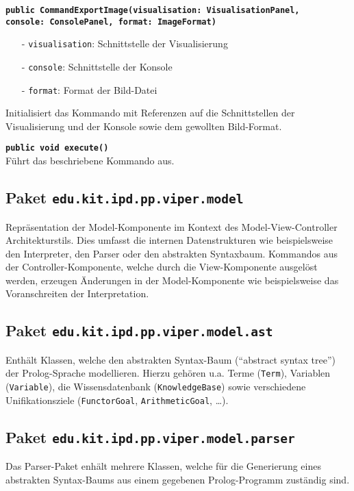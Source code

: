 \documentclass[parskip=full,11pt,twoside]{scrartcl}
\begin{document}
\textbf{\texttt{public CommandExportImage(visualisation: VisualisationPanel,\\console: ConsolePanel, format: ImageFormat)}}\\
\begin{itemize}[noitemsep]
	\item[-] \texttt{visualisation}: Schnittstelle der Visualisierung
	\item[-] \texttt{console}: Schnittstelle der Konsole
	\item[-] \texttt{format}: Format der Bild-Datei
\end{itemize}
Initialisiert das Kommando mit Referenzen auf die Schnittstellen der Visualisierung und der Konsole sowie dem gewollten Bild-Format.

\textbf{\texttt{public void execute()}}\\
Führt das beschriebene Kommando aus.

\subsection{Paket \texttt{edu.kit.ipd.pp.viper.model}}
Repräsentation der Model-Komponente im Kontext des Model-View-Controller Architekturstils. Dies umfasst die internen Datenstrukturen wie beispielsweise den Interpreter, den Parser oder den abstrakten Syntaxbaum. Kommandos aus der Controller-Komponente, welche durch die View-Komponente ausgelöst werden, erzeugen Änderungen in der Model-Komponente wie beispielsweise das Voranschreiten der Interpretation.

\subsection{Paket \texttt{edu.kit.ipd.pp.viper.model.ast}}
Enthält Klassen, welche den abstrakten Syntax-Baum (\enquote{abstract syntax tree}) der Prolog-Sprache modellieren. Hierzu gehören u.a. Terme (\texttt{Term}), Variablen (\texttt{Variable}), die Wissensdatenbank (\texttt{KnowledgeBase}) sowie verschiedene Unifikationsziele (\texttt{FunctorGoal}, \texttt{ArithmeticGoal}, \dots).

\subsection{Paket \texttt{edu.kit.ipd.pp.viper.model.parser}}
Das Parser-Paket enhält mehrere Klassen, welche für die Generierung eines abstrakten Syntax-Baums aus einem gegebenen Prolog-Programm zuständig sind.
\end{document}
